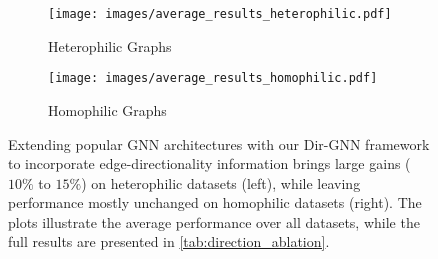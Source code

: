 \documentclass{article}
\newcommand\oursacro{Dir-GNN}
\theoremstyle{plain}
\theoremstyle{definition}
\theoremstyle{remark}
\begin{document}
\begin{figure}[t!]
\centering
\vspace{-7mm}
\begin{subfigure}[b]{0.4\textwidth}
     \centering
     \texttt{[image: images/average\_results\_heterophilic.pdf]}
     \caption{Heterophilic Graphs}
     \label{fig:aggregate_results_heterophilic}
\end{subfigure}
\begin{subfigure}[b]{0.375\textwidth}
     \centering
     \texttt{[image: images/average\_results\_homophilic.pdf]}
     \caption{Homophilic Graphs}
     \label{fig:aggregate_results_homophilic}
\end{subfigure}
\vspace{-1mm}
\caption{Extending popular GNN architectures with our \oursacro{} framework to incorporate edge-directionality information brings large gains ($10\%$ to $15\%$) on heterophilic datasets (left), while leaving performance mostly unchanged on homophilic datasets (right). The plots illustrate the average performance over all datasets, while the full results are presented in \cref{tab:direction_ablation}.}
\label{fig:aggregate_results}
\vspace{-4mm}
\end{figure}
\end{document}
